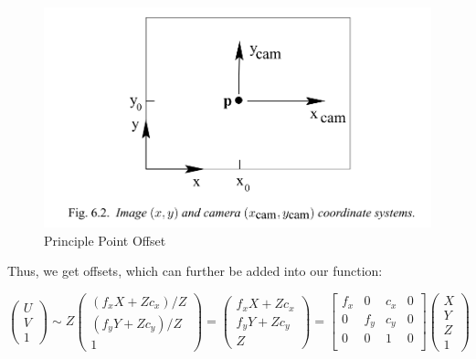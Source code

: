 \documentclass[a4paper]{report}
\numberwithin{figure}{section}
\begin{document}
\begin{figure}[H]
	\centering
	\includegraphics[width=\linewidth,natwidth=640,natheight=640]
  {fig/ref_imgs/pinhole_offset.png}
	\caption{Principle Point Offset}
	\label{fig:pinhole_offset}
\end{figure}

Thus, we get offsets, which can further be added into our function:

\begin{equation}
  \begin{pmatrix}
    U\\
    V\\
    1
  \end{pmatrix}
  \sim
  Z
  \begin{pmatrix}
    (f_xX + Z c_x)/Z\\
    (f_yY + Z c_y)/Z\\
    1
  \end{pmatrix}
  =
  \begin{pmatrix}
    f_xX + Z c_x\\
    f_yY + Z c_y\\
    Z
  \end{pmatrix}
  =
  \begin{bmatrix}
    f_x & 0 & c_x & 0\\
    0 & f_y & c_y & 0\\
    0 & 0 & 1 & 0\\
  \end{bmatrix}
  \begin{pmatrix}
    X\\
    Y\\
    Z\\
    1
  \end{pmatrix}
\end{equation} \label{eq:proj_func_w_f_c}
\end{document}
